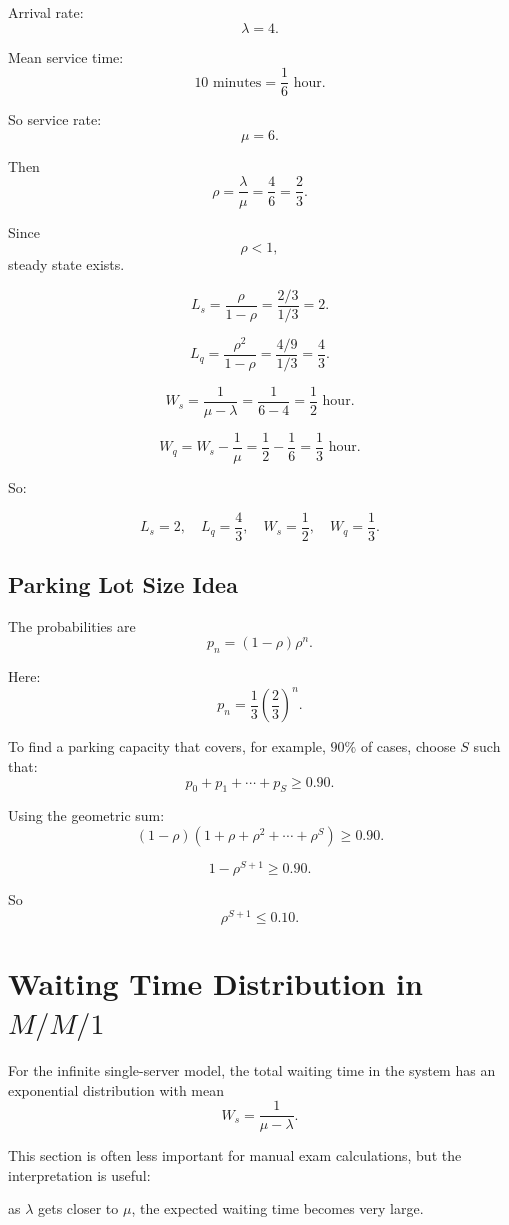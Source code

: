 \documentclass[12pt]{article}
\begin{document}
Arrival rate:
\[
\lambda=4.
\]

Mean service time:
\[
10\text{ minutes}=\frac16\text{ hour}.
\]

So service rate:
\[
\mu=6.
\]

Then
\[
\rho=\frac{\lambda}{\mu}=\frac46=\frac23.
\]

Since
\[
\rho<1,
\]
steady state exists.

\[
L_s=\frac{\rho}{1-\rho}
=
\frac{2/3}{1/3}=2.
\]

\[
L_q=\frac{\rho^2}{1-\rho}
=
\frac{4/9}{1/3}
=
\frac43.
\]

\[
W_s=\frac{1}{\mu-\lambda}
=
\frac{1}{6-4}
=
\frac12\text{ hour}.
\]

\[
W_q=W_s-\frac1{\mu}
=
\frac12-\frac16
=
\frac13\text{ hour}.
\]

So:

\[
\boxed{L_s=2,\quad L_q=\frac43,\quad W_s=\frac12,\quad W_q=\frac13.}
\]

\subsection*{Parking Lot Size Idea}

The probabilities are
\[
p_n=(1-\rho)\rho^n.
\]

Here:
\[
p_n=\frac13\left(\frac23\right)^n.
\]

To find a parking capacity that covers, for example, \(90\%\) of cases, choose \(S\) such that:
\[
p_0+p_1+\cdots+p_S\geq 0.90.
\]

Using the geometric sum:
\[
(1-\rho)(1+\rho+\rho^2+\cdots+\rho^S)\geq 0.90.
\]

\[
1-\rho^{S+1}\geq 0.90.
\]

So
\[
\rho^{S+1}\leq 0.10.
\]

\section{Waiting Time Distribution in \(M/M/1\)}

For the infinite single-server model, the total waiting time in the system has an exponential distribution with mean
\[
W_s=\frac{1}{\mu-\lambda}.
\]

This section is often less important for manual exam calculations, but the interpretation is useful:

\begin{center}
as \(\lambda\) gets closer to \(\mu\), the expected waiting time becomes very large.
\end{center}
\end{document}
